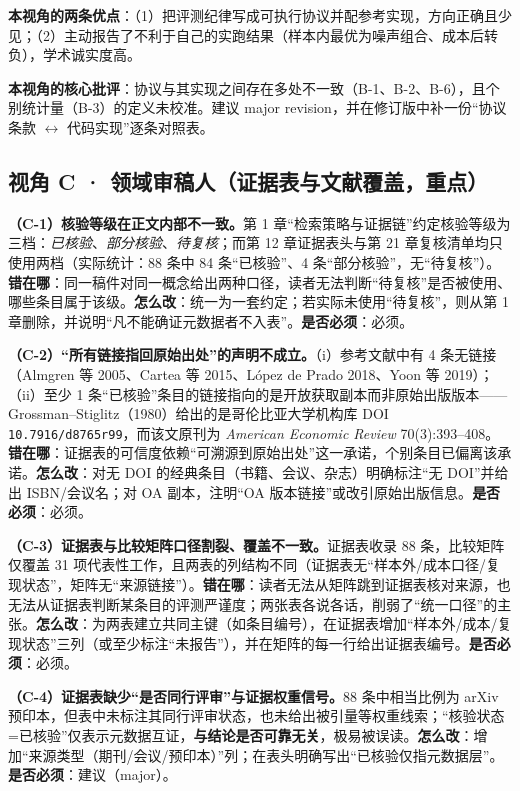 \documentclass[11pt,a4paper]{ctexart}
\begin{document}
\textbf{本视角的两条优点}：（1）把评测纪律写成可执行协议并配参考实现，方向正确且少见；（2）主动报告了不利于自己的实跑结果（样本内最优为噪声组合、成本后转负），学术诚实度高。

\textbf{本视角的核心批评}：协议与其实现之间存在多处不一致（B-1、B-2、B-6），且个别统计量（B-3）的定义未校准。建议 major revision，并在修订版中补一份“协议条款 $\leftrightarrow$ 代码实现”逐条对照表。

\subsection{视角 C · 领域审稿人（证据表与文献覆盖，重点）}

\textbf{（C-1）核验等级在正文内部不一致。}第 1 章“检索策略与证据链”约定核验等级为三档：\emph{已核验}、\emph{部分核验}、\emph{待复核}；而第 12 章证据表头与第 21 章复核清单均只使用两档（实际统计：88 条中 84 条“已核验”、4 条“部分核验”，无“待复核”）。\textbf{错在哪}：同一稿件对同一概念给出两种口径，读者无法判断“待复核”是否被使用、哪些条目属于该级。\textbf{怎么改}：统一为一套约定；若实际未使用“待复核”，则从第 1 章删除，并说明“凡不能确证元数据者不入表”。\textbf{是否必须}：必须。

\textbf{（C-2）“所有链接指回原始出处”的声明不成立。}（i）参考文献中有 4 条无链接（Almgren 等 2005、Cartea 等 2015、López de Prado 2018、Yoon 等 2019）；（ii）至少 1 条“已核验”条目的链接指向的是开放获取副本而非原始出版版本——Grossman--Stiglitz（1980）给出的是哥伦比亚大学机构库 DOI \texttt{10.7916/d8765r99}，而该文原刊为 \emph{American Economic Review} 70(3):393--408。\textbf{错在哪}：证据表的可信度依赖“可溯源到原始出处”这一承诺，个别条目已偏离该承诺。\textbf{怎么改}：对无 DOI 的经典条目（书籍、会议、杂志）明确标注“无 DOI”并给出 ISBN/会议名；对 OA 副本，注明“OA 版本链接”或改引原始出版信息。\textbf{是否必须}：必须。

\textbf{（C-3）证据表与比较矩阵口径割裂、覆盖不一致。}证据表收录 88 条，比较矩阵仅覆盖 31 项代表性工作，且两表的列结构不同（证据表无“样本外/成本口径/复现状态”，矩阵无“来源链接”）。\textbf{错在哪}：读者无法从矩阵跳到证据表核对来源，也无法从证据表判断某条目的评测严谨度；两张表各说各话，削弱了“统一口径”的主张。\textbf{怎么改}：为两表建立共同主键（如条目编号），在证据表增加“样本外/成本/复现状态”三列（或至少标注“未报告”），并在矩阵的每一行给出证据表编号。\textbf{是否必须}：必须。

\textbf{（C-4）证据表缺少“是否同行评审”与证据权重信号。}88 条中相当比例为 arXiv 预印本，但表中未标注其同行评审状态，也未给出被引量等权重线索；“核验状态=已核验”仅表示元数据互证，\textbf{与结论是否可靠无关}，极易被误读。\textbf{怎么改}：增加“来源类型（期刊/会议/预印本）”列；在表头明确写出“已核验仅指元数据层”。\textbf{是否必须}：建议（major）。
\end{document}
